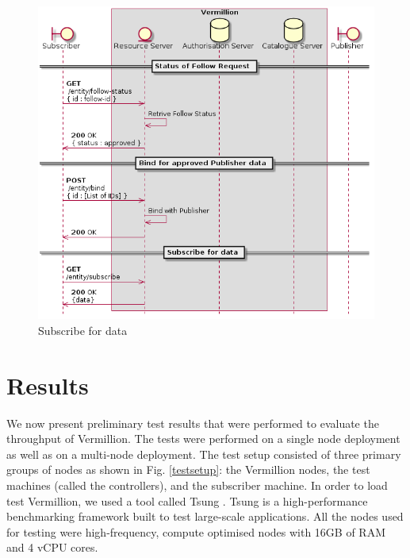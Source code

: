 \documentclass[conference, 10pt]{IEEEtran}
\begin{document}
\begin{figure}
\includegraphics[width=\linewidth, height=\linewidth, keepaspectratio]{subscribe.png}
\caption{Subscribe for data}
\label{subscribe}
\end{figure}

\section{Results}

We now present preliminary test results that were performed to evaluate the throughput of Vermillion. The tests were performed on a single node deployment as well as on a multi-node deployment. The test setup consisted of three primary groups of nodes as shown in Fig. \ref{testsetup}: the Vermillion nodes, the test machines (called the controllers), and the subscriber machine. In order to load test Vermillion, we used a tool called Tsung \cite{tsung}. Tsung is a high-performance benchmarking framework built to test large-scale applications. All the nodes used for testing were high-frequency, compute optimised nodes with 16GB of RAM and 4 vCPU cores. 
\end{document}
